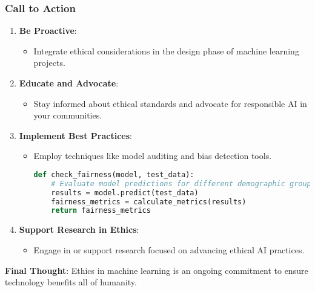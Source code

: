 \documentclass{beamer}
\begin{document}
\begin{frame}[fragile]
    \frametitle{Call to Action}
    \begin{enumerate}
        \item \textbf{Be Proactive}:
        \begin{itemize}
            \item Integrate ethical considerations in the design phase of machine learning projects.
        \end{itemize}
        
        \item \textbf{Educate and Advocate}:
        \begin{itemize}
            \item Stay informed about ethical standards and advocate for responsible AI in your communities.
        \end{itemize}
        
        \item \textbf{Implement Best Practices}:
        \begin{itemize}
            \item Employ techniques like model auditing and bias detection tools.
            \begin{lstlisting}[language=Python]
def check_fairness(model, test_data):
    # Evaluate model predictions for different demographic groups
    results = model.predict(test_data)
    fairness_metrics = calculate_metrics(results)
    return fairness_metrics
            \end{lstlisting}
        \end{itemize}
        
        \item \textbf{Support Research in Ethics}:
        \begin{itemize}
            \item Engage in or support research focused on advancing ethical AI practices.
        \end{itemize}
    \end{enumerate}
    
    \textbf{Final Thought}: Ethics in machine learning is an ongoing commitment to ensure technology benefits all of humanity.
\end{frame}
\end{document}
